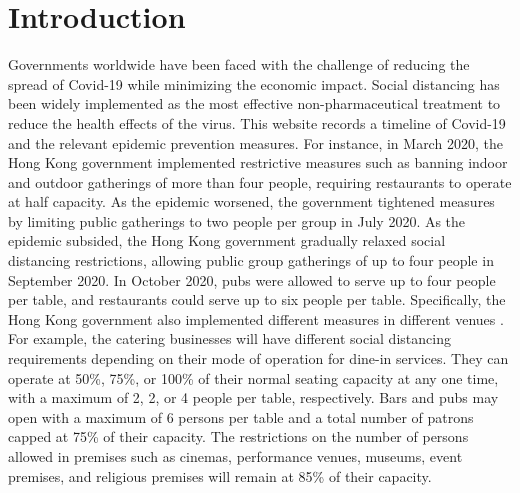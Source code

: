 \section{Introduction}
Governments worldwide have been faced with the challenge of reducing the spread of Covid-19 while minimizing the economic impact. Social distancing has been widely implemented as the most effective non-pharmaceutical treatment to reduce the health effects of the virus. 
This website records a timeline of Covid-19 and the relevant epidemic prevention measures\cite{Covid19Timeline}. For instance, in March 2020, the Hong Kong government implemented restrictive measures such as banning indoor and outdoor gatherings of more than four people, requiring restaurants to operate at half capacity. As the epidemic worsened, the government tightened measures by limiting public gatherings to two people per group in July 2020. As the epidemic subsided, the Hong Kong government gradually relaxed social distancing restrictions, allowing public group gatherings of up to four people in September 2020. In October 2020, pubs were allowed to serve up to four people per table, and restaurants could serve up to six people per table. Specifically, the Hong Kong government also implemented different measures in different venues \cite{Gov202209}. For example, the catering businesses will have different social distancing requirements depending on their mode of operation for dine-in services. They can operate at 50\%, 75\%, or 100\% of their normal seating capacity at any one time, with a maximum of 2, 2, or 4 people per table, respectively. Bars and pubs may open with a maximum of 6 persons per table and a total number of patrons capped at 75\% of their capacity. The restrictions on the number of persons allowed in premises such as cinemas, performance venues, museums, event premises, and religious premises will remain at 85\% of their capacity.



